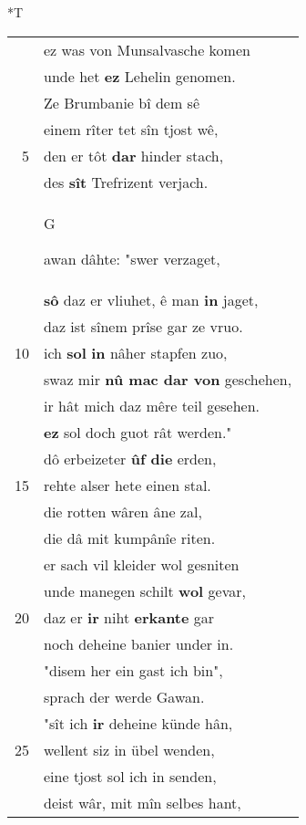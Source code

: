 \documentclass[8pt,a4paper,notitlepage]{article}
\begin{document}
\begin{table}[ht]
\begin{minipage}[t]{0.5\linewidth}
\end{minipage}
\hspace{0.5cm}
\begin{minipage}[t]{0.5\linewidth}
\small
\begin{center}*T
\end{center}
\begin{tabular}{rl}
 & ez was von Munsalvasche komen\\ 
 & unde het \textbf{ez} Lehelin genomen.\\ 
 & Ze Brumbanie bî dem sê\\ 
 & einem rîter tet sîn tjost wê,\\ 
5 & den er tôt \textbf{dar} hinder stach,\\ 
 & des \textbf{sît} Trefrizent verjach.\\ 
 & \begin{large}G\end{large}awan dâhte: "swer verzaget,\\ 
 & \textbf{sô} daz er vliuhet, ê man \textbf{in} jaget,\\ 
 & daz ist sînem prîse gar ze vruo.\\ 
10 & ich \textbf{sol} \textbf{in} nâher stapfen zuo,\\ 
 & swaz mir \textbf{nû mac dar von} geschehen,\\ 
 & ir hât mich daz mêre teil gesehen.\\ 
 & \textbf{ez} sol doch guot rât werden."\\ 
 & dô erbeizeter \textbf{ûf die} erden,\\ 
15 & rehte alser hete einen stal.\\ 
 & die rotten wâren âne zal,\\ 
 & die dâ mit kumpânîe riten.\\ 
 & er sach vil kleider wol gesniten\\ 
 & unde manegen schilt \textbf{wol} gevar,\\ 
20 & daz er \textbf{ir} niht \textbf{erkante} gar\\ 
 & noch deheine banier under in.\\ 
 & "disem her ein gast ich bin",\\ 
 & sprach der werde Gawan.\\ 
 & "sît ich \textbf{ir} deheine künde hân,\\ 
25 & wellent siz in übel wenden,\\ 
 & eine tjost sol ich in senden,\\ 
 & deist wâr, mit mîn selbes hant,\\ 

\end{tabular}
\end{minipage}
\end{table}
\end{document}

